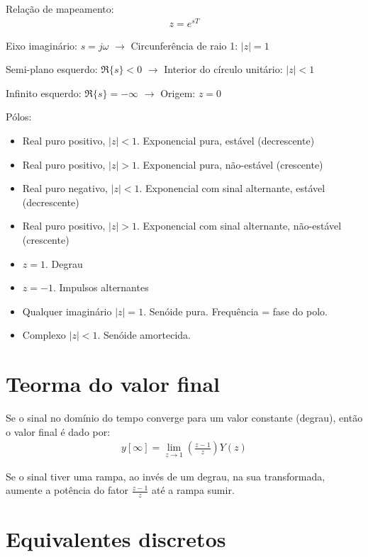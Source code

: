 \documentclass[12pt, a4paper]{article}
\begin{document}
Relação de mapeamento:
\begin{align}
	z = e^{sT}
\end{align}

Eixo imaginário: $s=j\omega$ $\rightarrow$ Circunferência de raio 1: $|z|=1$

Semi-plano esquerdo: $\Re\{s\}<0$ $\rightarrow$ Interior do círculo unitário: $|z|<1$

Infinito esquerdo: $\Re\{s\}=-\infty$ $\rightarrow$ Origem: $z=0$

Pólos:

\begin{itemize}
\item Real puro positivo, $|z|<1$. Exponencial pura, estável (decrescente)

\item Real puro positivo, $|z|>1$. Exponencial pura, não-estável (crescente)

\item Real puro negativo, $|z|<1$. Exponencial com sinal alternante, estável (decrescente)

\item Real puro positivo, $|z|>1$. Exponencial com sinal alternante, não-estável (crescente)

\item $z=1$. Degrau

\item $z=-1$. Impulsos alternantes

\item Qualquer imaginário $|z|=1$. Senóide pura. Frequência = fase do polo.

\item Complexo $|z|<1$. Senóide amortecida. 
\end{itemize}

\section{Teorma do valor final}

Se o sinal no domínio do tempo converge para um valor constante (degrau), então o valor final é dado por:
\begin{align}
	y[\infty] = \lim\limits_{z\rightarrow 1} \left(\frac{z-1}{z}\right) Y(z)
\end{align}

Se o sinal tiver uma rampa, ao invés de um degrau, na sua transformada, aumente a potência do fator $\frac{z-1}{z}$ até a rampa sumir. 

\section{Equivalentes discretos}
\end{document}
